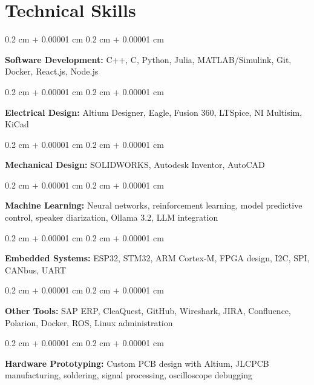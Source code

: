 \documentclass[10pt, letterpaper]{article}
\newenvironment{onecolentry}{
    \begin{adjustwidth}{
        0.2 cm + 0.00001 cm
    }{
        0.2 cm + 0.00001 cm
    }
}{
    \end{adjustwidth}
} %
\begin{document}
        \vspace{0.1 cm} %
        \vspace{0.2 cm} %

        \section{Technical Skills}
        \begin{onecolentry}
        \textbf{Software Development:} C++, C, Python, Julia, MATLAB/Simulink, Git, Docker, React.js, Node.js
        \end{onecolentry}
        
        \vspace{0.2 cm}
        
        \begin{onecolentry}
        \textbf{Electrical Design:} Altium Designer, Eagle, Fusion 360, LTSpice, NI Multisim, KiCad
        \end{onecolentry}
        
        \vspace{0.2 cm}
        
        \begin{onecolentry}
        \textbf{Mechanical Design:} SOLIDWORKS, Autodesk Inventor, AutoCAD
        \end{onecolentry}
        
        \vspace{0.2 cm}
        
        \begin{onecolentry}
        \textbf{Machine Learning:} Neural networks, reinforcement learning, model predictive control, speaker diarization, Ollama 3.2, LLM integration
        \end{onecolentry}
        
        \vspace{0.2 cm}
        
        \begin{onecolentry}
        \textbf{Embedded Systems:} ESP32, STM32, ARM Cortex-M, FPGA design, I2C, SPI, CANbus, UART
        \end{onecolentry}
        
        \vspace{0.2 cm}
        
        \begin{onecolentry}
        \textbf{Other Tools:} SAP ERP, CleaQuest, GitHub, Wireshark, JIRA, Confluence, Polarion, Docker, ROS, Linux administration
        \end{onecolentry}
        
        \vspace{0.2 cm}
        
        \begin{onecolentry}
        \textbf{Hardware Prototyping:} Custom PCB design with Altium, JLCPCB manufacturing, soldering, signal processing, oscilloscope debugging
        \end{onecolentry}
        
        
\end{document}
